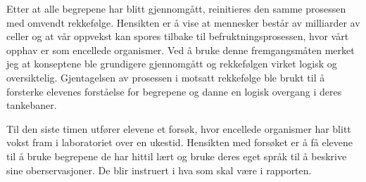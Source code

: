 \documentclass[main.tex]{subfiles}
\begin{document}
Etter at alle begrepene har blitt gjennomgått, reinitieres den samme prosessen med omvendt rekkefølge.
Hensikten er å vise at mennesker består av milliarder av celler og 
at vår oppvekst kan spores tilbake til befruktningsprosessen, hvor vårt opphav er som
encellede organismer. Ved å bruke denne fremgangsmåten merket jeg at konseptene ble grundigere
gjennomgått og rekkefølgen virket logisk og oversiktelig. Gjentagelsen av prosessen i motsatt
rekkefølge ble brukt til å forsterke elevenes forståelse for begrepene og danne en logisk 
overgang i deres tankebaner. 
\newline

Til den siste timen utfører elevene et forsøk, hvor encellede organismer har blitt vokst fram 
i laboratoriet over en ukestid. Hensikten med forsøket er å få elevene til å bruke begrepene 
de har hittil lært og bruke deres eget språk til å beskrive sine oberservasjoner. De blir
instruert i hva som skal være i rapporten.


\end{document}

